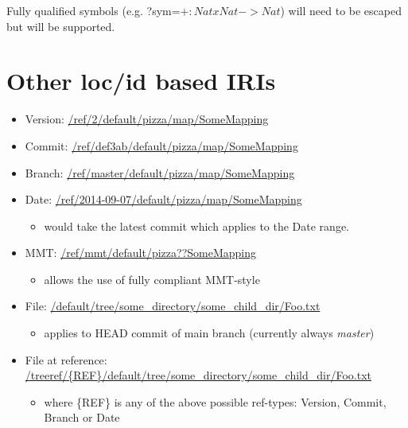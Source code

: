 \documentclass[a4paper,11pt,DIV=25]{scrartcl}
\begin{document}
Fully qualified symbols (e.g. ?sym=$+:NatxNat->Nat$) will need to be escaped
but will be supported.

\section{Other loc/id based IRIs}

\begin{itemize}
  \item Version: \url{/ref/2/default/pizza/map/SomeMapping}
  \item Commit: \url{/ref/def3ab/default/pizza/map/SomeMapping}
  \item Branch: \url{/ref/master/default/pizza/map/SomeMapping}
  \item Date: \url{/ref/2014-09-07/default/pizza/map/SomeMapping}
    \begin{itemize}
      \item would take the latest commit which applies to the Date range.
    \end{itemize}
  \item MMT: \url{/ref/mmt/default/pizza??SomeMapping}
    \begin{itemize}
      \item allows the use of fully compliant MMT-style
    \end{itemize}
  \item File: \url{/default/tree/some_directory/some_child_dir/Foo.txt}
    \begin{itemize}
      \item applies to HEAD commit of main branch (currently always \textit{master})
    \end{itemize}
  \item File at reference: \url{/treeref/{REF}/default/tree/some_directory/some_child_dir/Foo.txt}
    \begin{itemize}
      \item where \{REF\} is any of the above possible ref-types: Version, Commit, Branch or Date
    \end{itemize}
\end{itemize}
\end{document}
